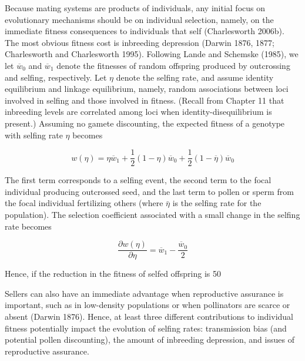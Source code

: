 \documentclass{article}
\begin{document}
Because mating systems are products of individuals, any initial focus on evolutionary mechanisms should be on individual selection, namely, on the immediate fitness consequences to individuals that self (Charlesworth 2006b). The most obvious fitness cost is inbreeding depression (Darwin 1876, 1877; Charlesworth and Charlesworth 1995). Following Lande and Schemske (1985), we let  $ \overline{w}_{0} $ and  $ \overline{w}_{1} $ denote the fitnesses of random offspring produced by outcrossing and selfing, respectively. Let  $ \eta $ denote the selfing rate, and assume identity equilibrium and linkage equilibrium, namely, random associations between loci involved in selfing and those involved in fitness. (Recall from Chapter 11 that inbreeding levels are correlated among loci when identity-disequilibrium is present.) Assuming no gamete discounting, the expected fitness of a genotype with selfing rate  $ \eta $ becomes

\begin{equation}
w(\eta)=\eta\overline{w}_{1}+\frac{1}{2}\left(1-\eta\right)\overline{w}_{0}+\frac{1}{2}\left(1-\overline{\eta}\right)\overline{w}_{0}
\tag{23.69a}
\label{eq:23_69a}
\end{equation}

The first term corresponds to a selfing event, the second term to the focal individual producing outcrossed seed, and the last term to pollen or sperm from the focal individual fertilizing others (where  $ \bar{\eta} $ is the selfing rate for the population). The selection coefficient associated with a small change in the selfing rate becomes

\begin{equation}
\frac{\partial w(\eta)}{\partial\eta}=\overline{w}_{1}-\frac{\overline{w}_{0}}{2}
\tag{23.69b}
\label{eq:23_69b}
\end{equation}

Hence, if the reduction in the fitness of selfed offspring is 50%

Sellers can also have an immediate advantage when reproductive assurance is important, such as in low-density populations or when pollinators are scarce or absent (Darwin 1876). Hence, at least three different contributions to individual fitness potentially impact the evolution of selfing rates: transmission bias (and potential pollen discounting), the amount of inbreeding depression, and issues of reproductive assurance.
\end{document}
